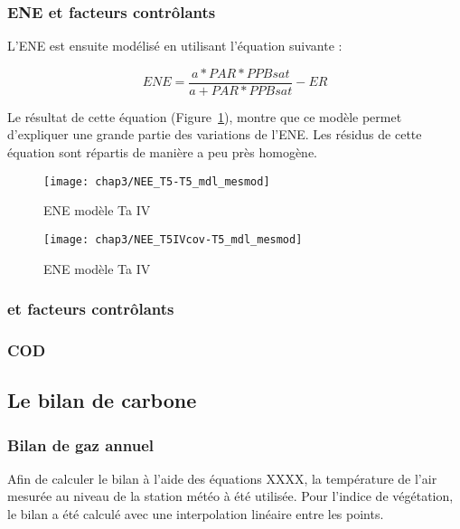 \subsubsection{ENE et facteurs contrôlants}

L'ENE est ensuite modélisé en utilisant l'équation suivante :

\begin{equation}
ENE = \frac{a*PAR*PPBsat}{a+PAR*PPBsat}-ER
\end{equation}

Le résultat de cette équation (Figure~\ref{fig:ENE_T5_mdl}), montre que ce modèle permet d'expliquer une grande partie des variations de l'ENE.
Les résidus de cette équation sont répartis de manière a peu près homogène.

\begin{figure}
\centering
\texttt{[image: chap3/NEE\_T5-T5\_mdl\_mesmod]}
\caption{ENE modèle Ta IV}
\label{fig:ENE_T5_mdl}
\end{figure}

\begin{figure}
\centering
\texttt{[image: chap3/NEE\_T5IVcov-T5\_mdl\_mesmod]}
\caption{ENE modèle Ta IV}
\label{fig:ENE_T5IV_mdl}
\end{figure}



\subsubsection{\chh et facteurs contrôlants}

\subsubsection{COD}

\subsection{Le bilan de carbone}

\subsubsection{Bilan de gaz annuel}

Afin de calculer le bilan à l'aide des équations XXXX, la température de l'air mesurée au niveau de la station météo à été utilisée.
Pour l'indice de végétation, le bilan a été calculé avec une interpolation linéaire entre les points.

